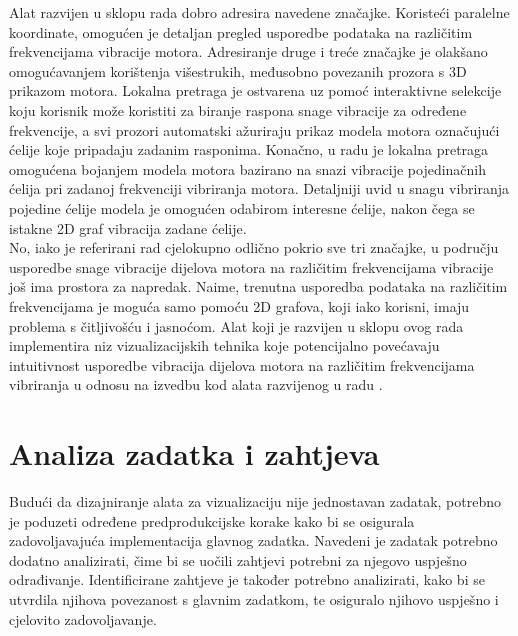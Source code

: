 \documentclass[times, utf8, diplomski]{fer}
\begin{document}
Alat razvijen u sklopu rada \citep{matkovic2021getting} dobro adresira navedene značajke. Koristeći paralelne koordinate, omogućen je detaljan pregled usporedbe podataka na različitim frekvencijama vibracije motora. Adresiranje druge i treće značajke je olakšano omogućavanjem korištenja višestrukih, međusobno povezanih prozora s 3D prikazom motora. Lokalna pretraga je ostvarena uz pomoć interaktivne selekcije koju korisnik može koristiti za biranje raspona snage vibracije za određene frekvencije, a svi prozori automatski ažuriraju prikaz modela motora označujući ćelije koje pripadaju zadanim rasponima. Konačno, u radu \citep{matkovic2021getting} je lokalna pretraga omogućena bojanjem modela motora bazirano na snazi vibracije pojedinačnih ćelija pri zadanoj frekvenciji vibriranja motora. Detaljniji uvid u snagu vibriranja pojedine ćelije modela je omogućen odabirom interesne ćelije, nakon čega se istakne 2D graf vibracija  zadane ćelije.\\

No, iako je referirani rad cjelokupno odlično pokrio sve tri značajke, u području usporedbe snage vibracije dijelova motora na različitim frekvencijama vibracije još ima prostora za napredak. Naime, trenutna usporedba podataka na različitim frekvencijama je moguća samo pomoću 2D grafova, koji iako korisni, imaju problema s čitljivošću i jasnoćom. Alat koji je razvijen u sklopu ovog rada implementira niz vizualizacijskih tehnika koje potencijalno povećavaju intuitivnost usporedbe vibracija dijelova motora na različitim frekvencijama vibriranja u odnosu na izvedbu kod alata razvijenog u radu \citep{matkovic2021getting}.

\chapter{Analiza zadatka i zahtjeva}
Budući da dizajniranje alata za vizualizaciju nije jednostavan zadatak, potrebno je poduzeti određene predprodukcijske korake kako bi se osigurala zadovoljavajuća implementacija glavnog zadatka. Navedeni je zadatak potrebno dodatno analizirati, čime bi se uočili zahtjevi potrebni za njegovo uspješno odrađivanje. Identificirane zahtjeve je također potrebno analizirati, kako bi se utvrdila njihova povezanost s glavnim zadatkom, te osiguralo njihovo uspješno i cjelovito zadovoljavanje. 
\end{document}
